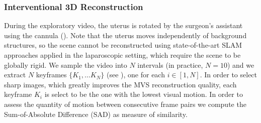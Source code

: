 \subsubsection{Interventional 3D Reconstruction}
\label{sec:sfm}
During the exploratory video, the uterus is rotated by the surgeon's assistant using the cannula (). Note that the uterus moves independently of background structures, so the scene cannot be reconstructed using state-of-the-art SLAM approaches applied in the laparoscopic setting, which require the scene to be globally rigid. 
We sample the video into $N$ intervals (in practice, $N=10$) and we extract $N$ keyframes $\{K_1,\dots K_N\}$ (see ), one for each $i\in [1,N]$. 
In order to select sharp images, which greatly improves the MVS reconstruction quality, each keyframe $K_i$ is select to be the one with the lowest visual motion. In order to assess the quantity of motion between consecutive frame pairs we compute the Sum-of-Absolute Difference (SAD) as measure of similarity.
